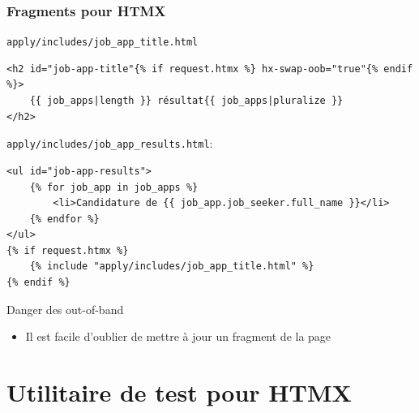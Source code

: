 \documentclass{beamer}
\begin{document}
\begin{frame}[fragile]
    \frametitle{Fragments pour HTMX}
    \texttt{apply/includes/job\_app\_title.html}
    \begin{verbatim}
<h2 id="job-app-title"{% if request.htmx %} hx-swap-oob="true"{% endif %}>
    {{ job_apps|length }} résultat{{ job_apps|pluralize }}
</h2>
    \end{verbatim}
    \texttt{apply/includes/job\_app\_results.html}:
    \begin{verbatim}
<ul id="job-app-results">
    {% for job_app in job_apps %}
        <li>Candidature de {{ job_app.job_seeker.full_name }}</li>
    {% endfor %}
</ul>
{% if request.htmx %}
    {% include "apply/includes/job_app_title.html" %}
{% endif %}
    \end{verbatim}
\end{frame}

\begin{frame}{Danger des out-of-band}
    \begin{itemize}
        \item Il est facile d'oublier de mettre à jour un fragment de la page
    \end{itemize}
\end{frame}

\section{Utilitaire de test pour HTMX}
\end{document}
